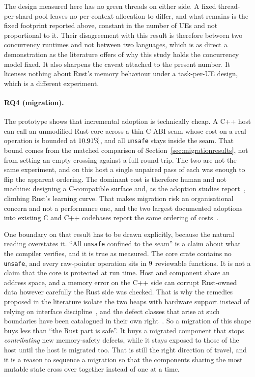 \documentclass[english,oneside,a4paper,censored,csm,software-track-2020]{HYthesisML}
\begin{document}
The design measured here
has no green threads on either side. A fixed thread-per-shard pool leaves no per-context
allocation to differ, and what remains is the fixed footprint reported above, constant in the
number of UEs and not proportional to it. Their disagreement with this result is therefore
between two concurrency runtimes and not between two languages, which is as direct a
demonstration as the literature offers of why this study holds the concurrency model fixed. It
also sharpens the caveat attached to the present number. It licenses nothing about Rust's
memory behaviour under a task-per-UE design, which is a different experiment.

\paragraph{RQ4 (migration).} The prototype shows that incremental adoption is technically
cheap. A C++ host can call an unmodified Rust core across a thin C-ABI seam whose cost on a
real operation is bounded at $10.91\%$, and all \texttt{unsafe} stays inside the seam.
That bound comes from the matched comparison of Section~\ref{sec:migrationresults}, not
from setting an empty crossing
against a full round-trip. The two are not the same experiment, and on this host a single
unpaired pass of each was enough to flip the apparent ordering. The dominant cost is
therefore human and not machine: designing a C-compatible surface and, as the adoption
studies report~\cite{fulton2021adopting,crichton2024learning}, climbing Rust's learning curve.
That makes migration risk an organisational concern and not a performance one, and the two
largest documented adoptions into existing C and C++ codebases report the same ordering of
costs~\cite{li2026rustlinux,fan2026android}.

One boundary on that result has to be drawn explicitly, because the natural reading overstates
it. ``All \texttt{unsafe} confined to the seam'' is a claim about what the compiler verifies,
and it is true as measured. The core crate contains no \texttt{unsafe}, and every raw-pointer
operation sits in $9$ reviewable functions. It is not a claim that the core is protected at run
time. Host and component share an address space, and a memory error on the C++ side can corrupt
Rust-owned data however carefully the Rust side was checked. That is why the remedies proposed
in the literature isolate the two heaps with hardware support instead of relying on interface
discipline~\cite{rivera2021galeed,kirth2022pkrusafe}, and the defect classes that arise at such
boundaries have been catalogued in their own right~\cite{li2022crosslang}. So a migration
of this shape buys less than ``the Rust part is safe''. It buys a migrated
component that stops \emph{contributing} new memory-safety defects, while it stays exposed to those
of the host until the host is migrated too. That is still the right direction of travel, and it
is a reason to sequence a migration so that the components sharing the most mutable state cross
over together instead of one at a time.
\end{document}
